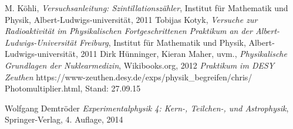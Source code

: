 \documentclass[12pt,listof=totoc]{scrartcl}
\begin{document}

\newpage
\thispagestyle{empty}
\begin{thebibliography}{9}

	M. Köhli,
	\emph{Versuchsanleitung: Szintillationszähler},
	Institut für Mathematik und Physik,
	Albert-Ludwigs-universität,
	2011
	Tobijas Kotyk,
	\emph{Versuche zur Radioaktivität im Physikalischen Fortgeschrittenen Praktikum an der Albert-Ludwigs-Universität Freiburg},
	Institut für Mathematik und Physik,
	Albert-Ludwigs-universität,
	2011
	Dirk Hünninger, Kieran Maher, uvm.,
	\emph{Physikalische Grundlagen der Nuklearmedizin},
	Wikibooks.org,
	2012
	\emph{Praktikum im DESY Zeuthen}
	https://www-zeuthen.desy.de/exps/physik\_begreifen/chris/\\Photomultiplier.html,
	Stand: 27.09.15
	
Wolfgang Demtröder
 \emph{Experimentalphysik 4: Kern-, Teilchen-, und Astrophysik},
 Springer-Verlag,
 4. Auflage,
 2014
\end{thebibliography}
\end{document}
